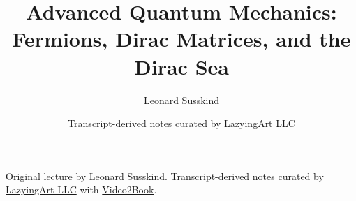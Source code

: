 \documentclass[11pt,oneside]{book}
\begin{document}
\hypersetup{pageanchor=false}
\frontmatter
\title{Advanced Quantum Mechanics: Fermions, Dirac Matrices, and the Dirac Sea}
\author{Leonard Susskind}
\date{Transcript-derived notes curated by \href{https://lazying.art}{LazyingArt LLC}}
\maketitle
\begin{center}
\small Original lecture by Leonard Susskind. Transcript-derived notes curated by \href{https://lazying.art}{LazyingArt LLC} with \href{https://github.com/lachlanchen/Video2Book}{Video2Book}.
\end{center}
\clearpage
\hypersetup{pageanchor=true}
\mainmatter

\end{document}
